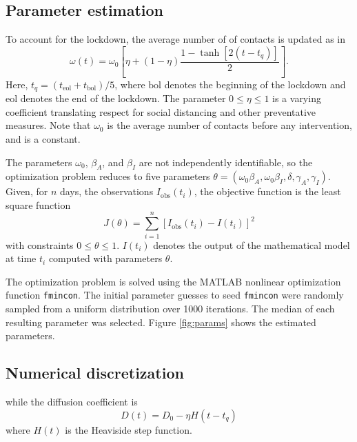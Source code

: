 \documentclass[11pt]{article}
\begin{document}
	\subsection{Parameter estimation}
		To account for the lockdown, the average number of of contacts is updated as in  \cite{Kevrekidis-2021}
		\begin{equation} \label{eq:contacts}
			\omega (t) = \omega_0 \left[ \eta + (1 - \eta) \frac{1 - \tanh \left[2 (t - t_q) \right]}{2} \right].
		\end{equation}
		Here, $t_q = (t_{\mathrm{eol}} + t_{\mathrm{bol}}) / 5$, where $\mathrm{bol}$ denotes the beginning of the lockdown and $\mathrm{eol}$ denotes the end of the lockdown.
		The parameter $0 \leq \eta \leq 1$ is a varying coefficient translating respect for social distancing and other preventative measures.
		Note that $\omega_0$ is the average number of contacts before any intervention, and is a constant.
		
		The parameters $\omega_0$, $\beta_A$, and $\beta_I$ are not independently identifiable, so the optimization problem reduces to five parameters $\theta = (\omega_0 \beta_A, \omega_0 \beta_I, \delta, \gamma_A, \gamma_I)$.
		Given, for $n$ days, the observations $I_\mathrm{obs} (t_i)$, the objective function is the least square function
		\begin{equation} \label{eq:obj}
			J (\theta) = \sum_{i=1}^n \left[ I_\mathrm{obs} (t_i) - I (t_i) \right]^2
		\end{equation}
		with constraints $0 \leq \theta \leq 1$.
		$I (t_i)$ denotes the output of the mathematical model at time $t_i$ computed with parameters $\theta$.
		
		The optimization problem is solved using the MATLAB nonlinear optimization function \verb|fmincon|.
		The initial parameter guesses to seed \verb|fmincon| were randomly sampled from a uniform distribution over 1000 iterations.
		The median of each resulting parameter was selected.
		Figure \ref{fig:params} shows the estimated parameters.
	
	\subsection{Numerical discretization}
		
		
		while the diffusion coefficient is
		\begin{equation} \label{eq:diffusion}
		D (t) = D_0  - \eta H(t - t_q)
		\end{equation}
		where $H(t)$ is the Heaviside step function.
\end{document}
